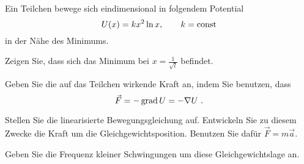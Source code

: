 \begin{atiTask}[
  title = Linearisierte Schwingungen
]
  Ein Teilchen bewege sich eindimensional in folgendem Potential
  \[
    U(x) = kx^2\ln x,\qquad k = \mathrm{const}
  \]
  in der Nähe des Minimums.
  \begin{atiSubtasks}
    \item{
      Zeigen Sie, dass sich das Minimum bei $x=\frac{1}{\sqrt{l}}$ befindet.
    }
    \item{
      Geben Sie die auf das Teilchen wirkende Kraft an, indem Sie benutzen, dass
      \[
        \vec{F} = -\operatorname{grad} U = -\nabla U \ .
      \]
    }
    \item{
      Stellen Sie die linearisierte Bewegungsgleichung auf.
      Entwickeln Sie zu diesem Zwecke die Kraft um die Gleichgewichtsposition.
      Benutzen Sie dafür $\vec{F} = m\vec{a}$.
    }
    \item{
      Geben Sie die Frequenz kleiner Schwingungen um diese Gleichgewichtslage an.
    }
  \end{atiSubtasks}
\end{atiTask}